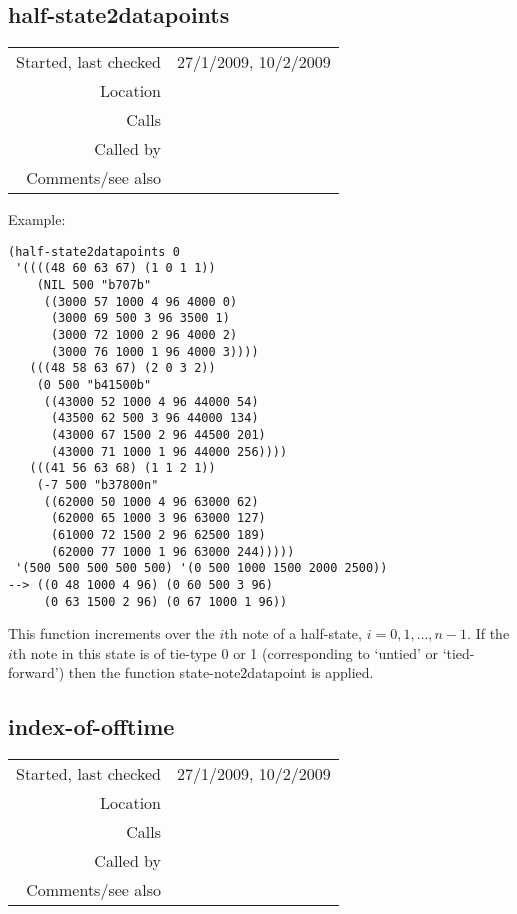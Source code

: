 \subsection*{half-state2datapoints}\label{fun:half-state2datapoints}

\vspace{0.3cm}
\begin{tabular}{r|p{8cm}}
Started, last checked & 27/1/2009, 10/2/2009 \\
Location & \nameref{sec:markov-compose} \\
Calls & \nameref{fun:state-note2datapoint} \\
Called by & \nameref{fun:states2datapoints} \\
Comments/see also & \nameref{fun:half-state2datapoints-by-lookup}
\end{tabular}

\vspace{0.5cm}
\noindent Example:
\begin{verbatim}
(half-state2datapoints 0
 '((((48 60 63 67) (1 0 1 1))
    (NIL 500 "b707b"
     ((3000 57 1000 4 96 4000 0)
      (3000 69 500 3 96 3500 1)
      (3000 72 1000 2 96 4000 2)
      (3000 76 1000 1 96 4000 3))))
   (((48 58 63 67) (2 0 3 2))
    (0 500 "b41500b"
     ((43000 52 1000 4 96 44000 54)
      (43500 62 500 3 96 44000 134)
      (43000 67 1500 2 96 44500 201)
      (43000 71 1000 1 96 44000 256))))
   (((41 56 63 68) (1 1 2 1))
    (-7 500 "b37800n"
     ((62000 50 1000 4 96 63000 62)
      (62000 65 1000 3 96 63000 127)
      (61000 72 1500 2 96 62500 189)
      (62000 77 1000 1 96 63000 244)))))
 '(500 500 500 500 500) '(0 500 1000 1500 2000 2500))
--> ((0 48 1000 4 96) (0 60 500 3 96)
     (0 63 1500 2 96) (0 67 1000 1 96))
\end{verbatim}

\noindent This function increments over the $i$th note
of a half-state, $i = 0, 1,\ldots, n-1$. If the $i$th
note in this state is of tie-type 0 or 1
(corresponding to `untied' or `tied-forward') then the
function state-note2datapoint is applied.


\subsection*{index-of-offtime}\label{fun:index-of-offtime}

\vspace{0.3cm}
\begin{tabular}{r|p{8cm}}
Started, last checked & 27/1/2009, 10/2/2009 \\
Location & \nameref{sec:markov-compose} \\
Calls & \nameref{fun:index-item-1st-occurs} \\
Called by & \nameref{fun:state-note2datapoint} \\
Comments/see also & \nameref{fun:index-of-offtime-by-lookup}
\end{tabular}

